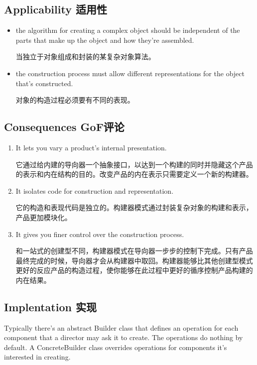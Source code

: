 \subsection{Applicability 适用性}

\begin{itemize}
\item the algorithm for creating a complex object should be independent of the parts that make up the object and how they're assembled.

      当独立于对象组成和封装的某复杂对象算法。

\item the construction process must allow different representations for the object that's constructed.

      对象的构造过程必须要有不同的表现。
\end{itemize}

\subsection{Consequences GoF评论}

\begin{enumerate}

\item It lets you vary a product's internal presentation.

	  它通过给内建的导向器一个抽象接口，以达到一个构建的同时并隐藏这个产品的表示和内在结构的目的。改变产品的内在表示只需要定义一个新的构建器。

\item It isolates code for construction and representation. 

	 它的构造和表现代码是独立的。构建器模式通过封装复杂对象的构建和表示，产品更加模块化。

\item It gives you finer control over the construction process.

	  和一站式的创建型不同，构建器模式在导向器一步步的控制下完成。只有产品最终完成的时候，导向器才会从构建器中取回。构建器能够比其他创建型模式更好的反应产品的构造过程，使你能够在此过程中更好的循序控制产品构建的内在结果。

\end{enumerate}

\subsection{Implentation 实现}

Typically there's an abstract Builder class that defines an operation for each component that a director may ask it to create. The operations do nothing by default. A ConcreteBuilder class overrides operations for components it's interested in creating.

